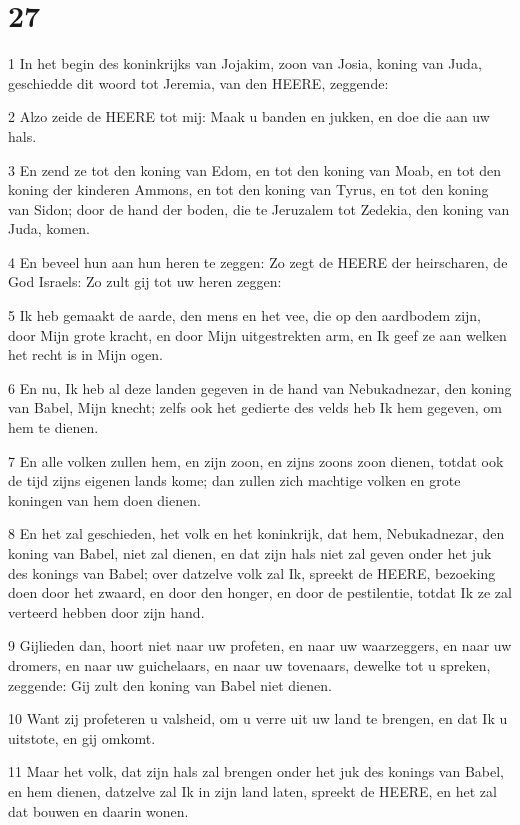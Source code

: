 \chapter{27}

\par 1 In het begin des koninkrijks van Jojakim, zoon van Josia, koning van Juda, geschiedde dit woord tot Jeremia, van den HEERE, zeggende:
\par 2 Alzo zeide de HEERE tot mij: Maak u banden en jukken, en doe die aan uw hals.
\par 3 En zend ze tot den koning van Edom, en tot den koning van Moab, en tot den koning der kinderen Ammons, en tot den koning van Tyrus, en tot den koning van Sidon; door de hand der boden, die te Jeruzalem tot Zedekia, den koning van Juda, komen.
\par 4 En beveel hun aan hun heren te zeggen: Zo zegt de HEERE der heirscharen, de God Israels: Zo zult gij tot uw heren zeggen:
\par 5 Ik heb gemaakt de aarde, den mens en het vee, die op den aardbodem zijn, door Mijn grote kracht, en door Mijn uitgestrekten arm, en Ik geef ze aan welken het recht is in Mijn ogen.
\par 6 En nu, Ik heb al deze landen gegeven in de hand van Nebukadnezar, den koning van Babel, Mijn knecht; zelfs ook het gedierte des velds heb Ik hem gegeven, om hem te dienen.
\par 7 En alle volken zullen hem, en zijn zoon, en zijns zoons zoon dienen, totdat ook de tijd zijns eigenen lands kome; dan zullen zich machtige volken en grote koningen van hem doen dienen.
\par 8 En het zal geschieden, het volk en het koninkrijk, dat hem, Nebukadnezar, den koning van Babel, niet zal dienen, en dat zijn hals niet zal geven onder het juk des konings van Babel; over datzelve volk zal Ik, spreekt de HEERE, bezoeking doen door het zwaard, en door den honger, en door de pestilentie, totdat Ik ze zal verteerd hebben door zijn hand.
\par 9 Gijlieden dan, hoort niet naar uw profeten, en naar uw waarzeggers, en naar uw dromers, en naar uw guichelaars, en naar uw tovenaars, dewelke tot u spreken, zeggende: Gij zult den koning van Babel niet dienen.
\par 10 Want zij profeteren u valsheid, om u verre uit uw land te brengen, en dat Ik u uitstote, en gij omkomt.
\par 11 Maar het volk, dat zijn hals zal brengen onder het juk des konings van Babel, en hem dienen, datzelve zal Ik in zijn land laten, spreekt de HEERE, en het zal dat bouwen en daarin wonen.
